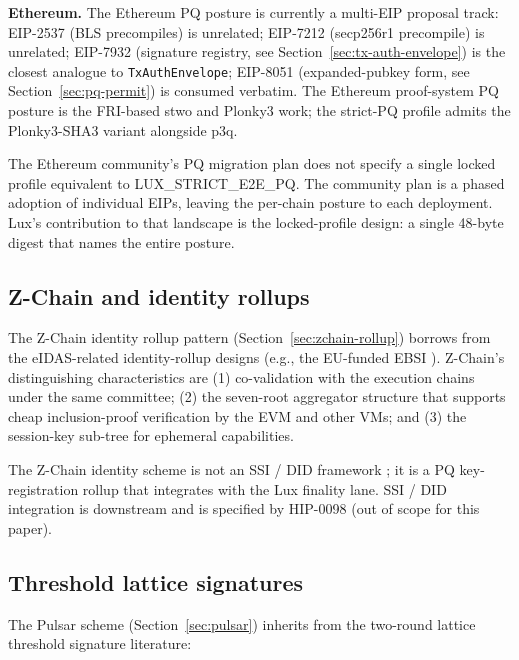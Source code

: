 \textbf{Ethereum.} The Ethereum PQ posture is currently a multi-EIP
proposal track: EIP-2537 (BLS precompiles) is unrelated; EIP-7212
(secp256r1 precompile) is unrelated; EIP-7932 (signature registry, see
Section~\ref{sec:tx-auth-envelope}) is the closest analogue to
\texttt{TxAuthEnvelope}; EIP-8051 (expanded-pubkey form, see
Section~\ref{sec:pq-permit}) is consumed verbatim. The Ethereum proof-system
PQ posture is the FRI-based stwo \cite{stwo} and Plonky3 \cite{plonky3}
work; the strict-PQ profile admits the Plonky3-SHA3 variant alongside p3q.

The Ethereum community's PQ migration plan does not specify a single locked
profile equivalent to LUX\_STRICT\_E2E\_PQ. The community plan is a phased
adoption of individual EIPs, leaving the per-chain posture to each
deployment. Lux's contribution to that landscape is the locked-profile
design: a single 48-byte digest that names the entire posture.

\subsection{Z-Chain and identity rollups}

The Z-Chain identity rollup pattern (Section~\ref{sec:zchain-rollup})
borrows from the eIDAS-related identity-rollup designs (e.g., the
EU-funded EBSI \cite{ebsi}). Z-Chain's distinguishing characteristics are
(1) co-validation with the execution chains under the same committee;
(2) the seven-root aggregator structure that supports cheap
inclusion-proof verification by the EVM and other VMs; and (3) the
session-key sub-tree for ephemeral capabilities.

The Z-Chain identity scheme is not an SSI / DID framework
\cite{w3cdid}; it is a PQ key-registration rollup that integrates with
the Lux finality lane. SSI / DID integration is downstream and is
specified by HIP-0098 (out of scope for this paper).

\subsection{Threshold lattice signatures}

The Pulsar scheme (Section~\ref{sec:pulsar}) inherits from the
two-round lattice threshold signature literature:

